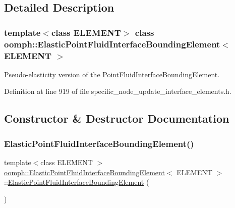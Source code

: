 \subsection{Detailed Description}
\subsubsection*{template$<$class E\+L\+E\+M\+E\+NT$>$\newline
class oomph\+::\+Elastic\+Point\+Fluid\+Interface\+Bounding\+Element$<$ E\+L\+E\+M\+E\+N\+T $>$}

Pseudo-\/elasticity version of the \hyperlink{classoomph_1_1PointFluidInterfaceBoundingElement}{Point\+Fluid\+Interface\+Bounding\+Element}. 

Definition at line 919 of file specific\+\_\+node\+\_\+update\+\_\+interface\+\_\+elements.\+h.



\subsection{Constructor \& Destructor Documentation}
\mbox{\label{classoomph_1_1ElasticPointFluidInterfaceBoundingElement_a18e40e63a31953ad02cb0a2e7d0577b3}} 
\subsubsection{\texorpdfstring{Elastic\+Point\+Fluid\+Interface\+Bounding\+Element()}{ElasticPointFluidInterfaceBoundingElement()}}
{\footnotesize\ttfamily template$<$class E\+L\+E\+M\+E\+NT $>$ \\
\hyperlink{classoomph_1_1ElasticPointFluidInterfaceBoundingElement}{oomph\+::\+Elastic\+Point\+Fluid\+Interface\+Bounding\+Element}$<$ E\+L\+E\+M\+E\+NT $>$\+::\hyperlink{classoomph_1_1ElasticPointFluidInterfaceBoundingElement}{Elastic\+Point\+Fluid\+Interface\+Bounding\+Element} (\begin{DoxyParamCaption}{ }\end{DoxyParamCaption})\hspace{0.3cm}{\ttfamily [inline]}}



